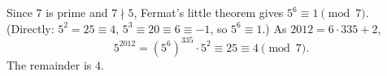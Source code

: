 Since $7$ is prime and $7\nmid5$, Fermat's little theorem gives $5^6\equiv1\pmod7$. (Directly: $5^2=25\equiv4$, $5^3\equiv20\equiv6\equiv-1$, so $5^6\equiv1$.) As $2012=6\cdot335+2$,
\[
5^{2012}=\left(5^6\right)^{335}\cdot5^2\equiv25\equiv4\pmod7 .
\]
The remainder is $\boxed{4}$.
